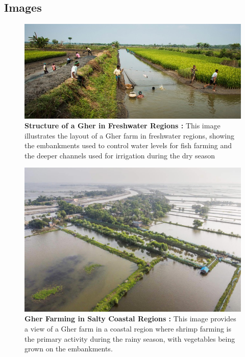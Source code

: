 \documentclass[conference]{IEEEtran}
\begin{document}
\subsection{Images}
\begin{figure}[h]
    \centering
    \includegraphics[width=\linewidth]{gher_freshwater.jpg}
    \caption{\textbf{Structure of a Gher in Freshwater Regions :} This image illustrates the layout of a Gher farm in freshwater regions, showing the embankments used to control water levels for fish farming and the deeper channels used for irrigation during the dry season}
    \label{fig:gher_freshwater}
\end{figure}

\begin{figure}[h]
    \centering
    \includegraphics[width=\linewidth]{gher_salty.jpg}
    \caption{\textbf{ Gher Farming in Salty Coastal Regions : } This image provides a view of a Gher farm in a coastal region where shrimp farming is the primary activity during the rainy season, with vegetables being grown on the embankments. }
    \label{fig:gher_salty}
\end{figure}
\end{document}
